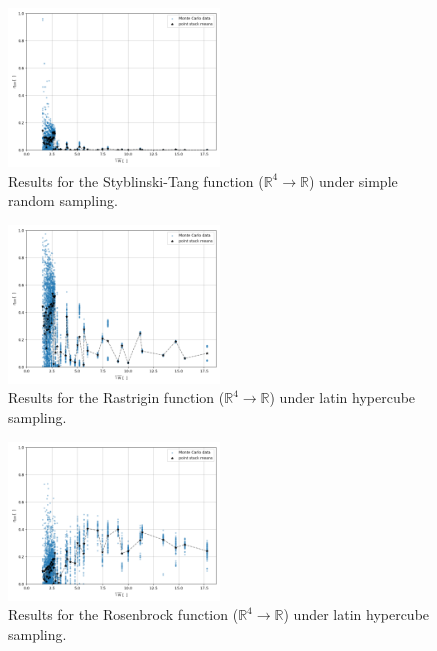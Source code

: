 \documentclass[conference]{IEEEtran}
\begin{document}
\begin{figure}[htbp]
	\centerline{\includegraphics[width=0.5\textwidth]{results/styblinskitang/results_sampling_simple_random_dimensionality_4.png}}
	\caption{Results for the Styblinski-Tang function ($\mathbb{R}^4\to\mathbb{R}$) under simple random sampling.}
	\label{fig:Styblinski-Tang_results_simple_random}
\end{figure}

\begin{figure}[htbp]
	\centerline{\includegraphics[width=0.5\textwidth]{results/rastrigin/results_sampling_latin_hypercube_dimensionality_4.png}}
	\caption{Results for the Rastrigin function ($\mathbb{R}^4\to\mathbb{R}$) under latin hypercube sampling.}
	\label{fig:Rastrigin_results_latin_hypercube}
\end{figure}

\begin{figure}[htbp]
	\centerline{\includegraphics[width=0.5\textwidth]{results/rosenbrock/results_sampling_latin_hypercube_dimensionality_4.png}}
	\caption{Results for the Rosenbrock function ($\mathbb{R}^4\to\mathbb{R}$) under latin hypercube sampling.}
	\label{fig:Rosenbrock_results_latin_hypercube}
\end{figure}
\end{document}
